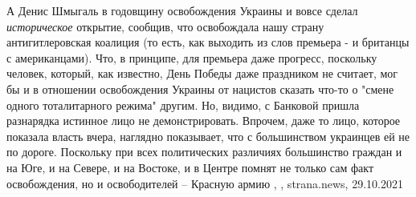 А Денис Шмыгаль в годовщину освобождения Украины и вовсе сделал
\emph{историческое} открытие, сообщив, что освобождала нашу страну
антигитлеровская коалиция (то есть, как выходить из слов премьера - и британцы
с американцами). Что, в принципе, для премьера даже прогресс, поскольку
человек, который, как известно, День Победы даже праздником не считает, мог бы
и в отношении освобождения Украины от нацистов сказать что-то о "смене одного
тоталитарного режима" другим. Но, видимо, с Банковой пришла разнарядка истинное
лицо не демонстрировать.  Впрочем, даже то лицо, которое показала власть вчера,
наглядно показывает, что с большинством украинцев ей не по дороге. Поскольку
при всех политических различиях большинство граждан и на Юге, и на Севере, и на
Востоке, и в Центре помнят не только сам факт освобождения, но и освободителей
– Красную армию
, 
, strana.news, 29.10.2021
